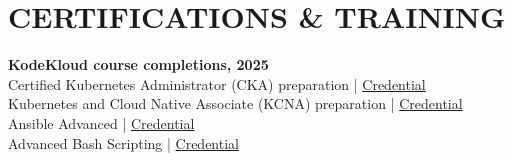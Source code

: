 \section{CERTIFICATIONS \& TRAINING}

\textbf{KodeKloud course completions, 2025}\\
Certified Kubernetes Administrator (CKA) preparation | \href{https://learn.kodekloud.com/certificate/02b28ebc-41eb-4991-83d3-cd6f230cf00d}{Credential}\\
Kubernetes and Cloud Native Associate (KCNA) preparation | \href{https://learn.kodekloud.com/certificate/53c237b2-9cf5-471d-9bb7-f08713280909}{Credential}\\
Ansible Advanced | \href{https://learn.kodekloud.com/certificate/29528ebb-1f53-4bdb-bdd0-9fdcccd07fa3}{Credential}\\
Advanced Bash Scripting | \href{https://learn.kodekloud.com/certificate/bb6cc4cc-1502-4d38-af34-a1ae29f092d2}{Credential}
